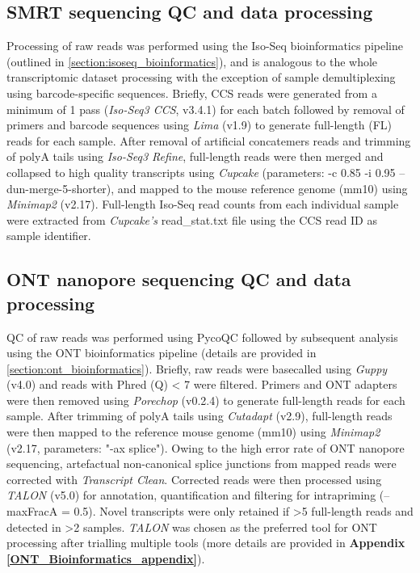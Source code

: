 \newpage
\subsection{SMRT sequencing QC and data processing}
Processing of raw reads was performed using the Iso-Seq bioinformatics pipeline (outlined in \cref{section:isoseq_bioinformatics}), and is analogous to the whole transcriptomic dataset processing with the exception of sample demultiplexing using barcode-specific sequences. Briefly, CCS reads were generated from a minimum of 1 pass (\textit{Iso-Seq3 CCS}, v3.4.1) for each batch followed by removal of primers and barcode sequences using \textit{Lima} (v1.9) to generate full-length (FL) reads for each sample. After removal of artificial concatemers reads and trimming of polyA tails using \textit{Iso-Seq3 Refine}, full-length reads were then merged and collapsed to high quality transcripts using \textit{Cupcake} (parameters: -c 0.85 -i 0.95 --dun-merge-5-shorter), and mapped to the mouse reference genome (mm10) using \textit{Minimap2} (v2.17). Full-length Iso-Seq read counts from each individual sample were extracted from \textit{Cupcake's} read\_stat.txt file using the CCS read ID as sample identifier.

\subsection{ONT nanopore sequencing QC and data processing}
QC of raw reads was performed using PycoQC followed by subsequent analysis using the ONT bioinformatics pipeline (details are provided in \cref{section:ont_bioinformatics}). Briefly, raw reads were basecalled using \textit{Guppy} (v4.0) and reads with Phred (Q) < 7 were filtered. Primers and ONT adapters were then removed using \textit{Porechop} (v0.2.4) to generate full-length reads for each sample. After trimming of polyA tails using \textit{Cutadapt} (v2.9), full-length reads were then mapped to the reference mouse genome (mm10) using \textit{Minimap2} (v2.17, parameters: "-ax splice"). Owing to the high error rate of ONT nanopore sequencing, artefactual non-canonical splice junctions from mapped reads were corrected with \textit{Transcript Clean}. Corrected reads were then processed using \textit{TALON} (v5.0) for annotation, quantification and filtering for intrapriming (--maxFracA = 0.5). Novel transcripts were only retained if >5 full-length reads and detected in >2 samples. \textit{TALON} was chosen as the preferred tool for ONT processing after trialling multiple tools (more details are provided in \textbf{Appendix} \textbf{\ref{ONT_Bioinformatics_appendix}}). 

